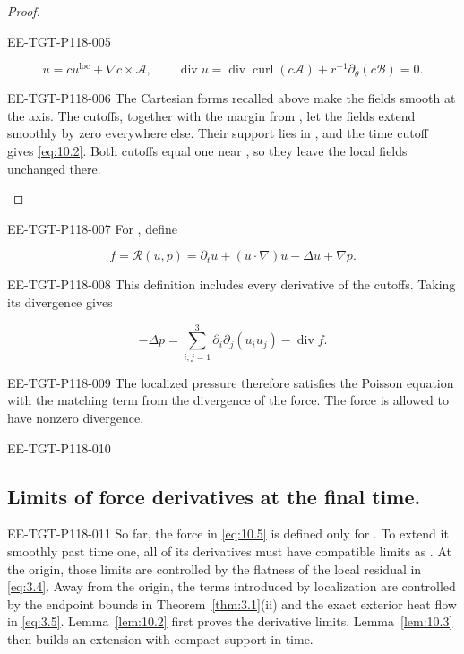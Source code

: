\begin{proof}
\begin{EESegment}{EE-TGT-P118-005}
\end{EESegment}
\[
u=cu^{\mathrm{loc}}+\nabla c\times\mathcal A,
\qquad \operatorname{div}u=\operatorname{div}\operatorname{curl}(c\mathcal A)
 +r^{-1}\partial_\theta(c\mathcal B)=0.
\]
\begin{EESegment}{EE-TGT-P118-006}
The Cartesian forms recalled above make the fields smooth at the axis. The cutoffs, together with
the margin from , let the fields extend smoothly by zero everywhere
else. Their support lies in , and the time cutoff
gives \eqref{eq:10.2}. Both cutoffs equal one near
, so they leave the local fields unchanged there.
\end{EESegment}
\end{proof}

\begin{EESegment}{EE-TGT-P118-007}
For , define
\end{EESegment}
\begin{equation}
f=\mathscr R(u,p)=\partial_tu+(u\mathbin{\cdot}\nabla)u-\Delta u+\nabla p.
\tag{10.5}\label{eq:10.5}
\end{equation}
\begin{EESegment}{EE-TGT-P118-008}
This definition includes every derivative of the cutoffs. Taking its divergence gives
\end{EESegment}
\[
-\Delta p=\sum_{i,j=1}^3\partial_i\partial_j(u_iu_j)-\operatorname{div}f.
\]
\begin{EESegment}{EE-TGT-P118-009}
The localized pressure therefore satisfies the Poisson equation with the matching term from the
divergence of the force. The force is allowed to have nonzero divergence.
\end{EESegment}

\begin{EESegment}{EE-TGT-P118-010}
\subsection{Limits of force derivatives at the final time.}\label{sec:10.2}
\end{EESegment}
\begin{EESegment}{EE-TGT-P118-011}
So far, the force in \eqref{eq:10.5} is defined only for
. To extend it smoothly past time one, all of its derivatives must have
compatible limits as . At the origin, those limits are controlled
by the flatness of the local residual in \eqref{eq:3.4}. Away from the origin, the terms introduced
by localization are controlled by the endpoint bounds in Theorem~\ref{thm:3.1}\textup{(ii)} and
the exact exterior heat flow in \eqref{eq:3.5}. Lemma~\ref{lem:10.2} first proves the derivative
limits. Lemma~\ref{lem:10.3} then builds an extension with compact support in time.
\end{EESegment}

